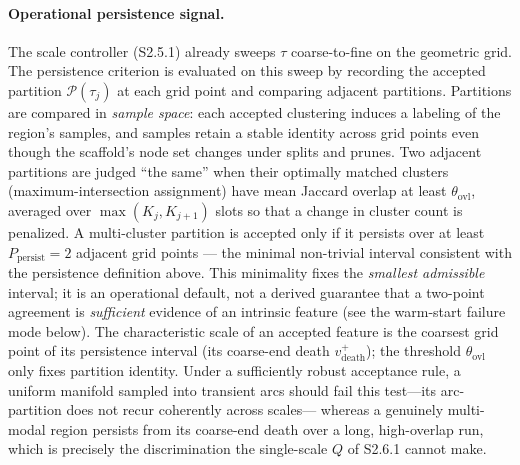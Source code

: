 \documentclass[11pt]{article}
\begin{document}
\paragraph{Operational persistence signal.}
The scale controller (S2.5.1) already sweeps $\tau$ coarse-to-fine on the
geometric grid. The persistence criterion is evaluated on this sweep by
recording the accepted partition $\mathcal P(\tau_j)$ at each grid point and
comparing adjacent partitions. Partitions are compared in \emph{sample space}:
each accepted clustering induces a labeling of the region's samples, and samples
retain a stable identity across grid points even though the scaffold's node set
changes under splits and prunes. Two adjacent partitions are judged ``the same''
when their optimally matched clusters (maximum-intersection assignment) have mean
Jaccard overlap at least $\theta_{\mathrm{ovl}}$, averaged over
$\max(K_j,K_{j+1})$ slots so that a change in cluster count is penalized. A
multi-cluster partition is accepted only if it persists over at least
$P_{\mathrm{persist}}=2$ adjacent grid points --- the minimal non-trivial
interval consistent with the persistence definition above. This minimality fixes
the \emph{smallest admissible} interval; it is an operational default, not a
derived guarantee that a two-point agreement is \emph{sufficient} evidence of an
intrinsic feature (see the warm-start failure mode below). The characteristic
scale of an accepted feature is the coarsest grid point of its persistence
interval (its coarse-end death $v_{\mathrm{death}}^+$); the threshold
$\theta_{\mathrm{ovl}}$ only fixes partition identity. Under a sufficiently
robust acceptance rule, a uniform manifold sampled into transient arcs should
fail this test---its arc-partition does not recur coherently across scales---
whereas a genuinely multi-modal region persists from its coarse-end death over a
long, high-overlap run, which is precisely the discrimination the single-scale
$Q$ of S2.6.1 cannot make.
\end{document}
